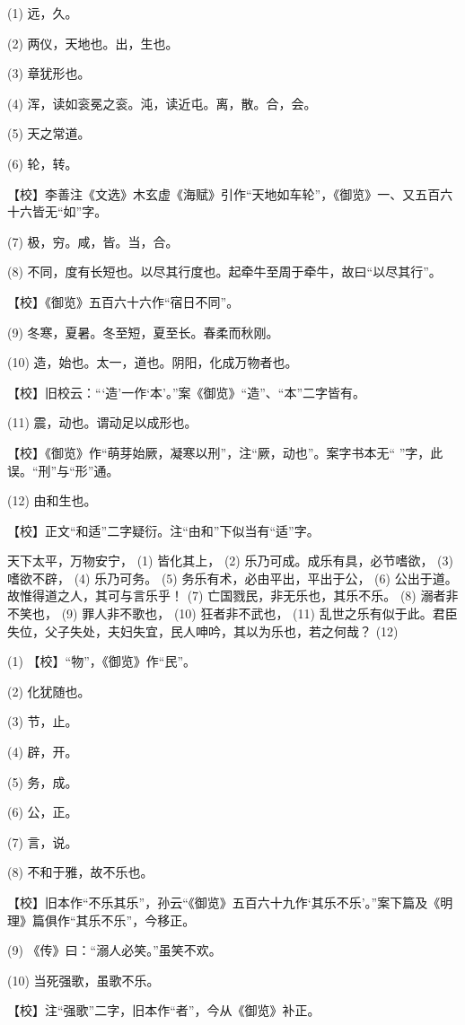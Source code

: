\documentclass[12pt,UTF8]{ctexbook}
\begin{document}
(1) 远，久。

(2) 两仪，天地也。出，生也。

(3) 章犹形也。

(4) 浑，读如衮冕之衮。沌，读近屯。离，散。合，会。

(5) 天之常道。

(6) 轮，转。

【校】李善注《文选》木玄虚《海赋》引作“天地如车轮”，《御览》一、又五百六十六皆无“如”字。

(7) 极，穷。咸，皆。当，合。

(8) 不同，度有长短也。以尽其行度也。起牵牛至周于牵牛，故曰“以尽其行”。

【校】《御览》五百六十六作“宿日不同”。

(9) 冬寒，夏暑。冬至短，夏至长。春柔而秋刚。

(10) 造，始也。太一，道也。阴阳，化成万物者也。

【校】旧校云：“‘造’一作‘本’。”案《御览》“造”、“本”二字皆有。

(11) 震，动也。谓动足以成形也。

【校】《御览》作“萌芽始厥，凝寒以刑”，注“厥，动也”。案字书本无“ ”字，此误。“刑”与“形”通。

(12) 由和生也。

【校】正文“和适”二字疑衍。注“由和”下似当有“适”字。

天下太平，万物安宁， (1) 皆化其上， (2) 乐乃可成。成乐有具，必节嗜欲， (3) 嗜欲不辟， (4) 乐乃可务。 (5) 务乐有术，必由平出，平出于公， (6) 公出于道。故惟得道之人，其可与言乐乎！ (7) 亡国戮民，非无乐也，其乐不乐。 (8) 溺者非不笑也， (9) 罪人非不歌也， (10) 狂者非不武也， (11) 乱世之乐有似于此。君臣失位，父子失处，夫妇失宜，民人呻吟，其以为乐也，若之何哉？ (12)

(1) 【校】“物”，《御览》作“民”。

(2) 化犹随也。

(3) 节，止。

(4) 辟，开。

(5) 务，成。

(6) 公，正。

(7) 言，说。

(8) 不和于雅，故不乐也。

【校】旧本作“不乐其乐”，孙云“《御览》五百六十九作‘其乐不乐’。”案下篇及《明理》篇俱作“其乐不乐”，今移正。

(9) 《传》曰：“溺人必笑。”虽笑不欢。

(10) 当死强歌，虽歌不乐。

【校】注“强歌”二字，旧本作“者”，今从《御览》补正。
\end{document}

